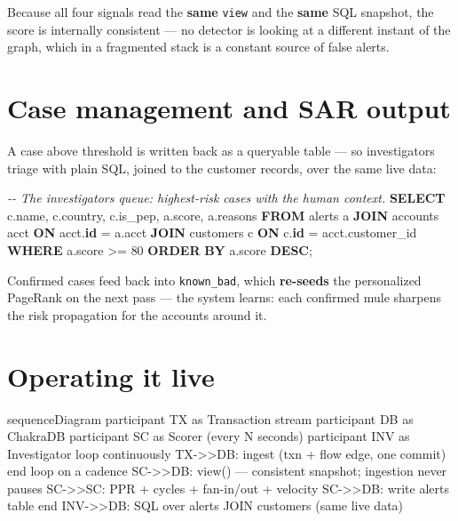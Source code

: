 \documentclass[
  11pt,
  openany]{book}
\newenvironment{Shaded}{}{}
\newcommand{\CommentTok}[1]{\textcolor[rgb]{0.38,0.63,0.69}{\textit{#1}}}
\newcommand{\DecValTok}[1]{\textcolor[rgb]{0.25,0.63,0.44}{#1}}
\newcommand{\KeywordTok}[1]{\textcolor[rgb]{0.00,0.44,0.13}{\textbf{#1}}}
\newcommand{\NormalTok}[1]{#1}
\newcommand{\OperatorTok}[1]{\textcolor[rgb]{0.40,0.40,0.40}{#1}}
\begin{document}
Because all four signals read the \textbf{same} \texttt{view} and the
\textbf{same} SQL snapshot, the score is internally consistent --- no
detector is looking at a different instant of the graph, which in a
fragmented stack is a constant source of false alerts.

\section{Case management and SAR
output}\label{case-management-and-sar-output}

A case above threshold is written back as a queryable table --- so
investigators triage with plain SQL, joined to the customer records,
over the same live data:

\begin{Shaded}
\begin{Highlighting}[]
\CommentTok{{-}{-} The investigator\textquotesingle{}s queue: highest{-}risk cases with the human context.}
\KeywordTok{SELECT}\NormalTok{ c.name, c.country, c.is\_pep, a.score, a.reasons}
\KeywordTok{FROM}\NormalTok{   alerts a}
\KeywordTok{JOIN}\NormalTok{   accounts   acct }\KeywordTok{ON}\NormalTok{ acct.}\KeywordTok{id} \OperatorTok{=}\NormalTok{ a.acct}
\KeywordTok{JOIN}\NormalTok{   customers  c    }\KeywordTok{ON}\NormalTok{ c.}\KeywordTok{id} \OperatorTok{=}\NormalTok{ acct.customer\_id}
\KeywordTok{WHERE}\NormalTok{  a.score }\OperatorTok{\textgreater{}=} \DecValTok{80}
\KeywordTok{ORDER}  \KeywordTok{BY}\NormalTok{ a.score }\KeywordTok{DESC}\NormalTok{;}
\end{Highlighting}
\end{Shaded}

Confirmed cases feed back into \texttt{known\_bad}, which
\textbf{re-seeds} the personalized PageRank on the next pass --- the
system learns: each confirmed mule sharpens the risk propagation for the
accounts around it.

\section{Operating it live}\label{operating-it-live}

\begin{Shaded}
\begin{Highlighting}[]
\NormalTok{sequenceDiagram}
\NormalTok{    participant TX as Transaction stream}
\NormalTok{    participant DB as ChakraDB}
\NormalTok{    participant SC as Scorer (every N seconds)}
\NormalTok{    participant INV as Investigator}
\NormalTok{    loop continuously}
\NormalTok{      TX{-}\textgreater{}\textgreater{}DB: ingest (txn + flow edge, one commit)}
\NormalTok{    end}
\NormalTok{    loop on a cadence}
\NormalTok{      SC{-}\textgreater{}\textgreater{}DB: view() — consistent snapshot; ingestion never pauses}
\NormalTok{      SC{-}\textgreater{}\textgreater{}SC: PPR + cycles + fan{-}in/out + velocity}
\NormalTok{      SC{-}\textgreater{}\textgreater{}DB: write alerts table}
\NormalTok{    end}
\NormalTok{    INV{-}\textgreater{}\textgreater{}DB: SQL over alerts JOIN customers (same live data)}
\end{Highlighting}
\end{Shaded}
\end{document}
